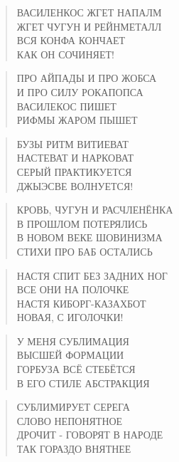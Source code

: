 \poemtitle{***}
\begin{verse}
ВАСИЛЕНКОС ЖГЕТ НАПАЛМ\\
ЖГЕТ ЧУГУН И РЕЙНМЕТАЛЛ\\
ВСЯ КОНФА КОНЧАЕТ\\
КАК ОН СОЧИНЯЕТ!
\end{verse}

\poemtitle{***}
\begin{verse}
ПРО АЙПАДЫ И ПРО ЖОБСА\\
И ПРО СИЛУ РОКАПОПСА\\
ВАСИЛЕКОС ПИШЕТ\\
РИФМЫ ЖАРОМ ПЫШЕТ
\end{verse}

\poemtitle{***}
\begin{verse}
БУЗЫ РИТМ ВИТИЕВАТ\\
НАСТЕВАТ И НАРКОВАТ\\
СЕРЫЙ ПРАКТИКУЕТСЯ\\
ДЖЫЭСВЕ ВОЛНУЕТСЯ!
\end{verse}

\poemtitle{***}
\begin{verse}
КРОВЬ, ЧУГУН И РАСЧЛЕНЁНКА\\
В ПРОШЛОМ ПОТЕРЯЛИСЬ\\
В НОВОМ ВЕКЕ ШОВИНИЗМА\\
СТИХИ ПРО БАБ ОСТАЛИСЬ
\end{verse}

\poemtitle{***}
\begin{verse}
НАСТЯ СПИТ БЕЗ ЗАДНИХ НОГ\\
ВСЕ ОНИ НА ПОЛОЧКЕ\\
НАСТЯ КИБОРГ-КАЗАХБОТ\\
НОВАЯ, С ИГОЛОЧКИ!
\end{verse}

\poemtitle{***}
\begin{verse}
У МЕНЯ СУБЛИМАЦИЯ\\
ВЫСШЕЙ ФОРМАЦИИ\\
ГОРБУЗА ВСЁ СТЕБЁТСЯ\\
В ЕГО СТИЛЕ АБСТРАКЦИЯ
\end{verse}

\poemtitle{***}
\begin{verse}
СУБЛИМИРУЕТ СЕРЕГА\\
СЛОВО НЕПОНЯТНОЕ\\
ДРОЧИТ - ГОВОРЯТ В НАРОДЕ\\
ТАК ГОРАЗДО ВНЯТНЕЕ
\end{verse}


